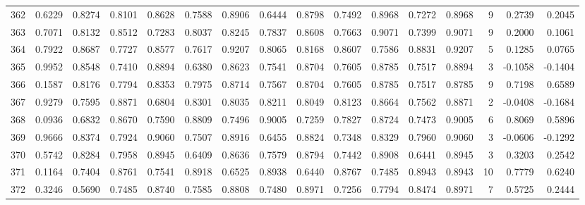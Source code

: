 \begin{tabular}{lrrrrrrrrrrrrrrr}
362 &      0.6229 &  0.8274 &  0.8101 &  0.8628 &  0.7588 &  0.8906 &  0.6444 &  0.8798 &  0.7492 &  0.8968 &   0.7272 &     0.8968 &      9 &                    0.2739 &                     0.2045 \\
363 &      0.7071 &  0.8132 &  0.8512 &  0.7283 &  0.8037 &  0.8245 &  0.7837 &  0.8608 &  0.7663 &  0.9071 &   0.7399 &     0.9071 &      9 &                    0.2000 &                     0.1061 \\
364 &      0.7922 &  0.8687 &  0.7727 &  0.8577 &  0.7617 &  0.9207 &  0.8065 &  0.8168 &  0.8607 &  0.7586 &   0.8831 &     0.9207 &      5 &                    0.1285 &                     0.0765 \\
365 &      0.9952 &  0.8548 &  0.7410 &  0.8894 &  0.6380 &  0.8623 &  0.7541 &  0.8704 &  0.7605 &  0.8785 &   0.7517 &     0.8894 &      3 &                   -0.1058 &                    -0.1404 \\
366 &      0.1587 &  0.8176 &  0.7794 &  0.8353 &  0.7975 &  0.8714 &  0.7567 &  0.8704 &  0.7605 &  0.8785 &   0.7517 &     0.8785 &      9 &                    0.7198 &                     0.6589 \\
367 &      0.9279 &  0.7595 &  0.8871 &  0.6804 &  0.8301 &  0.8035 &  0.8211 &  0.8049 &  0.8123 &  0.8664 &   0.7562 &     0.8871 &      2 &                   -0.0408 &                    -0.1684 \\
368 &      0.0936 &  0.6832 &  0.8670 &  0.7590 &  0.8809 &  0.7496 &  0.9005 &  0.7259 &  0.7827 &  0.8724 &   0.7473 &     0.9005 &      6 &                    0.8069 &                     0.5896 \\
369 &      0.9666 &  0.8374 &  0.7924 &  0.9060 &  0.7507 &  0.8916 &  0.6455 &  0.8824 &  0.7348 &  0.8329 &   0.7960 &     0.9060 &      3 &                   -0.0606 &                    -0.1292 \\
370 &      0.5742 &  0.8284 &  0.7958 &  0.8945 &  0.6409 &  0.8636 &  0.7579 &  0.8794 &  0.7442 &  0.8908 &   0.6441 &     0.8945 &      3 &                    0.3203 &                     0.2542 \\
371 &      0.1164 &  0.7404 &  0.8761 &  0.7541 &  0.8918 &  0.6525 &  0.8938 &  0.6440 &  0.8767 &  0.7485 &   0.8943 &     0.8943 &     10 &                    0.7779 &                     0.6240 \\
372 &      0.3246 &  0.5690 &  0.7485 &  0.8740 &  0.7585 &  0.8808 &  0.7480 &  0.8971 &  0.7256 &  0.7794 &   0.8474 &     0.8971 &      7 &                    0.5725 &                     0.2444 \\

\end{tabular}
